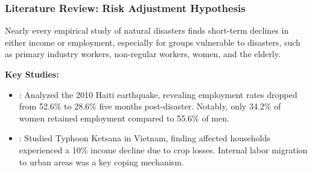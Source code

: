 \documentclass[serif, aspectratio=169]{beamer}
\newcommand{\returnbutton}[2]{%
  \vspace{-1.0cm}  %
  \hfill  %
  \hyperlink{#1}{%
    {\footnotesize\beamerbutton{#2}}%
  }%
  \vspace{0.3cm}  %
}
\begin{document}
\begin{frame}[label=risk_adjustment_hypothesis]
\frametitle{Literature Review: Risk Adjustment Hypothesis}

\vspace{-1.0cm} 
\returnbutton{literature_review2}{Return}


    Nearly every empirical study of natural disasters finds short-term declines in either income or employment, especially for groups vulnerable to disasters, such as primary industry workers, non-regular workers, women, and the elderly.
    
    \vspace{0.3cm}
    
    \textbf{Key Studies:}
    \begin{itemize}
        \item \citet{Kim2014ARetention}: Analyzed the 2010 Haiti earthquake, revealing employment rates dropped from 52.6\% to 28.6\% five months post-disaster. Notably, only 34.2\% of women retained employment compared to 55.6\% of men.
        \item \citet{Groger2016InternalTyphoon}: Studied Typhoon Ketsana in Vietnam, finding affected households experienced a 10\% income decline due to crop losses. Internal labor migration to urban areas was a key coping mechanism.
    \end{itemize}
    
\end{frame}

\end{document}

